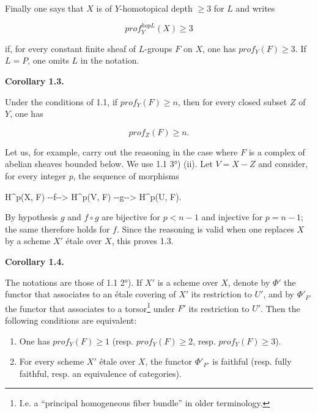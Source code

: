 \documentclass[
  11pt,
  a4paper,
]{book}
\newenvironment{Shaded}{}{}
\newcommand{\NormalTok}[1]{#1}
\begin{document}
Finally one says that \(X\) is of \(Y\)-homotopical depth
\(\geqslant 3\) for \(L\) and writes

\[ prof^{hopL}_{Y}(X) \geqslant 3 \]

if, for every constant finite sheaf of \(L\)-groups \(F\) on \(X\), one
has \(prof_{Y}(F) \geqslant 3\). If \(L = P\), one omits \(L\) in the
notation.

\textbf{Corollary 1.3.}

Under the conditions of 1.1, if \(prof_{Y}(F) \geqslant n\), then for
every closed subset \(Z\) of \(Y\), one has

\[ prof_{Z}(F) \geqslant n. \]

Let us, for example, carry out the reasoning in the case where \(F\) is
a complex of abelian sheaves bounded below. We use 1.1 3°) (ii). Let
\(V = X - Z\) and consider, for every integer \(p\), the sequence of
morphisms

\begin{Shaded}
\begin{Highlighting}[]
\NormalTok{H\^{}p(X, F) {-}{-}f{-}{-}\textgreater{} H\^{}p(V, F) {-}{-}g{-}{-}\textgreater{} H\^{}p(U, F).}
\end{Highlighting}
\end{Shaded}

By hypothesis \(g\) and \(f \circ g\) are bijective for \(p < n - 1\)
and injective for \(p = n - 1\); the same therefore holds for \(f\).
Since the reasoning is valid when one replaces \(X\) by a scheme \(X'\)
étale over \(X\), this proves 1.3.

\textbf{Corollary 1.4.}

The notations are those of 1.1 2°). If \(X'\) is a scheme over \(X\),
denote by \(\Phi'\) the functor that associates to an étale covering of
\(X'\) its restriction to \(U'\), and by \(\Phi'_{F'}\) the functor that
associates to a torsor\footnote{I.e. a ``principal homogeneous fiber
  bundle'' in older terminology.} under \(F'\) its restriction to
\(U'\). Then the following conditions are equivalent:

\begin{enumerate}
\def\labelenumi{(\roman{enumi})}
\item
  One has \(prof_{Y}(F) \geqslant 1\) (resp.
  \(prof_{Y}(F) \geqslant 2\), resp. \(prof_{Y}(F) \geqslant 3\)).
\item
  For every scheme \(X'\) étale over \(X\), the functor \(\Phi'_{F'}\)
  is faithful (resp. fully faithful, resp. an equivalence of
  categories).
\end{enumerate}
\end{document}
